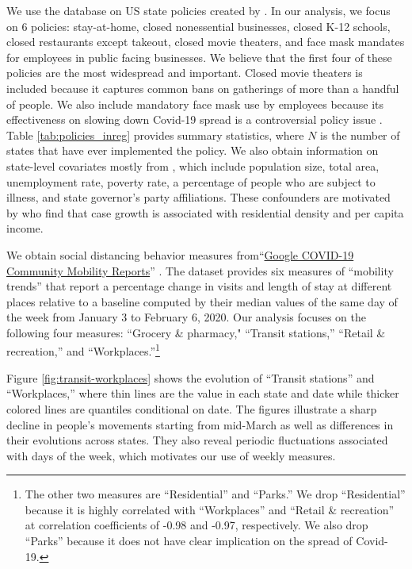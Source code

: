 \documentclass[3p, longtitle]{elsarticle}
\theoremstyle{definition}
\begin{document}
We use the database on US state policies created by
\cite{raifman2020}.
In our analysis, we focus on 6
policies:  stay-at-home, closed nonessential
businesses, closed K-12 schools, closed restaurants except takeout, closed movie theaters, and face mask mandates for employees in public facing businesses.
We believe that the first four of these
policies are the most widespread and important.
Closed movie theaters is included because it captures common bans on gatherings of more than
a handful of people. We also include mandatory face mask use by employees because its effectiveness on slowing down Covid-19 spread is a controversial policy issue \citep{howard2020,Greenhalghm2020,zhangr2020}.
Table \ref{tab:policies_inreg} provides summary statistics, where $N$ is the number of states that have ever implemented the policy. We also obtain information on state-level covariates mostly from \citet{raifman2020}, which include population size, total area, unemployment rate, poverty rate,  a percentage of people who are subject to illness, and state governor's party affiliations.  These confounders are motivated by \cite{wheaton2020} who find that case growth is associated  with residential density and per capita income.





We obtain social distancing behavior measures from``\href{https://www.google.com/covid19/mobility/}{Google COVID-19 Community Mobility Reports}''
\citep{google2020}.  The dataset provides six measures of ``mobility trends''  that report a percentage change in visits and length of stay at different places relative to a baseline computed by their median values of the same day of the week from January 3 to February 6, 2020.  Our analysis focuses on the following four measures: ``Grocery \& pharmacy," ``Transit stations,'' ``Retail \& recreation,'' and ``Workplaces.''\footnote{The other two measures are ``Residential'' and  ``Parks.''  We drop ``Residential'' because it is highly correlated with  ``Workplaces'' and  ``Retail \& recreation''  at correlation coefficients of -0.98 and -0.97, respectively. We also drop ``Parks'' because it does not have clear implication on the spread of Covid-19.}

Figure \ref{fig:transit-workplaces} shows the evolution of  ``Transit stations'' and ``Workplaces,'' where thin lines are the value in each state and date while thicker colored lines are quantiles  conditional on date. The figures illustrate a sharp decline in people's movements starting from mid-March as well as differences in their evolutions across states. They also reveal periodic fluctuations associated with days of the week, which motivates our use of weekly measures.
\end{document}
